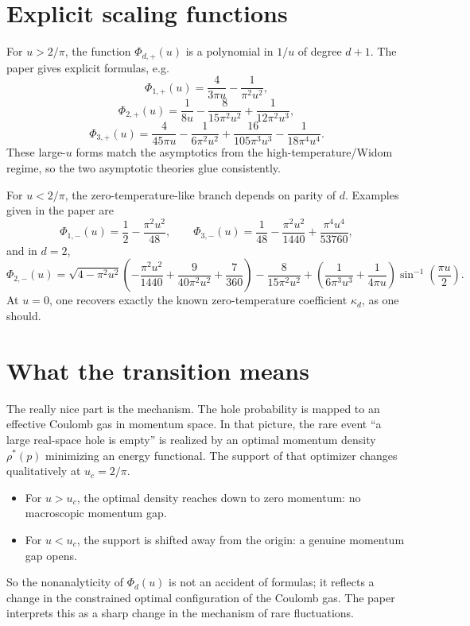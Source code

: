 \documentclass[11pt]{article}
\begin{document}
\section*{Explicit scaling functions}
For $u>2/\pi$, the function $\Phi_{d,+}(u)$ is a polynomial in $1/u$ of degree $d+1$. The paper gives explicit formulas, e.g.
\[
\Phi_{1,+}(u)=\frac{4}{3\pi u}-\frac{1}{\pi^2 u^2},
\]
\[
\Phi_{2,+}(u)=\frac{1}{8u}-\frac{8}{15\pi^2u^2}+\frac{1}{12\pi^2u^3},
\]
\[
\Phi_{3,+}(u)=\frac{4}{45\pi u}-\frac{1}{6\pi^2u^2}+\frac{16}{105\pi^3u^3}-\frac{1}{18\pi^4u^4}.
\]
These large-$u$ forms match the asymptotics from the high-temperature/Widom regime, so the two asymptotic theories glue consistently.

For $u<2/\pi$, the zero-temperature-like branch depends on parity of $d$. Examples given in the paper are
\[
\Phi_{1,-}(u)=\frac12-\frac{\pi^2u^2}{48},
\qquad
\Phi_{3,-}(u)=\frac{1}{48}-\frac{\pi^2u^2}{1440}+\frac{\pi^4u^4}{53760},
\]
and in $d=2$,
\[
\Phi_{2,-}(u)=
\sqrt{4-\pi^2u^2}\left(-\frac{\pi^2u^2}{1440}+\frac{9}{40\pi^2u^2}+\frac{7}{360}\right)
-\frac{8}{15\pi^2u^2}
+\left(\frac{1}{6\pi^3u^3}+\frac{1}{4\pi u}\right)\sin^{-1}\left(\frac{\pi u}{2}\right).
\]
At $u=0$, one recovers exactly the known zero-temperature coefficient $\kappa_d$, as one should.

\section*{What the transition means}
The really nice part is the mechanism. The hole probability is mapped to an effective Coulomb gas in momentum space. In that picture, the rare event ``a large real-space hole is empty'' is realized by an optimal momentum density $\rho^*(p)$ minimizing an energy functional. The support of that optimizer changes qualitatively at $u_c=2/\pi$.

\begin{itemize}[leftmargin=1.5em]
\item For $u>u_c$, the optimal density reaches down to zero momentum: no macroscopic momentum gap.
\item For $u<u_c$, the support is shifted away from the origin: a genuine momentum gap opens.
\end{itemize}

So the nonanalyticity of $\Phi_d(u)$ is not an accident of formulas; it reflects a change in the constrained optimal configuration of the Coulomb gas. The paper interprets this as a sharp change in the mechanism of rare fluctuations.
\end{document}
